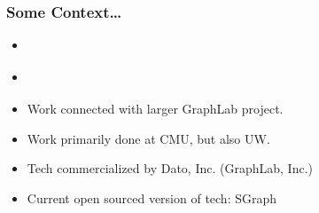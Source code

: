 \begin{frame}
\frametitle{Some Context\ldots}
\begin{itemize}
  \item \cite[OSDI '12 Paper]{gonzalez2012powergraph}
  \item \cite[OSDI '12 Video]{gonzalez2012powergraph-video}
  \item Work connected with larger GraphLab project.
  \item Work primarily done at CMU, but also UW.
  \item Tech commercialized by Dato, Inc. (GraphLab, Inc.)
  \item Current open sourced version of tech: SGraph
\end{itemize}
\end{frame}
